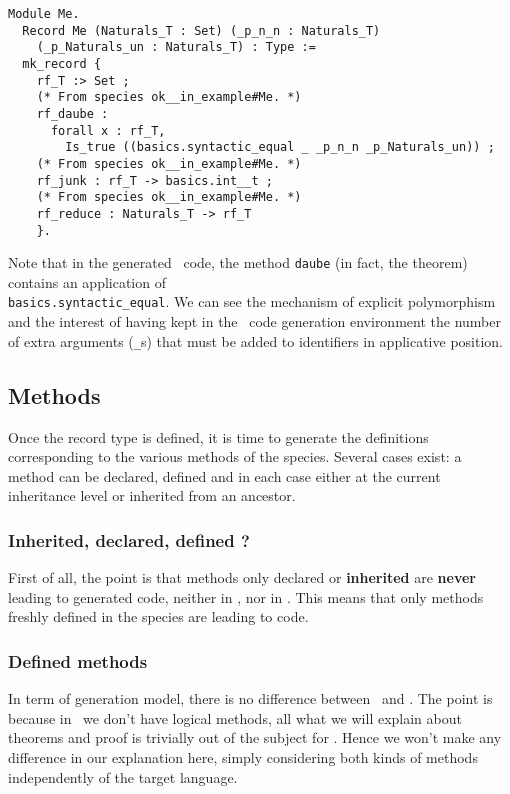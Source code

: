 {\footnotesize
\begin{lstlisting}[language=MyCoq]
Module Me.
  Record Me (Naturals_T : Set) (_p_n_n : Naturals_T)
    (_p_Naturals_un : Naturals_T) : Type :=
  mk_record {
    rf_T :> Set ;
    (* From species ok__in_example#Me. *)
    rf_daube :
      forall x : rf_T,
        Is_true ((basics.syntactic_equal _ _p_n_n _p_Naturals_un)) ;
    (* From species ok__in_example#Me. *)
    rf_junk : rf_T -> basics.int__t ;
    (* From species ok__in_example#Me. *)
    rf_reduce : Naturals_T -> rf_T
    }.
\end{lstlisting}}

\label{coq-explicit-polymorphism}
Note that in the generated \coq\ code, the method {\tt daube} (in
fact, the theorem) contains an application of \\
{\tt basics.syntactic\_equal}. We can see the mechanism of explicit
polymorphism and the interest of having kept in the \coq\ code
generation environment the number of extra arguments ({\tt \_}s) that
must be added to identifiers in applicative position.



\subsection{Methods}
\label{code-gen-model-methods}
Once the record type is defined, it is time to generate the
definitions corresponding to the various methods of the
species. Several cases exist: a method can be declared, defined and in
each case either at the current inheritance level or inherited from an
ancestor.

\subsubsection{Inherited, declared, defined ?}
First of all, the point is that methods only declared or {\bf inherited}
are {\bf never} leading to generated code, neither in \ocaml, nor in
\coq. This means that only methods freshly defined in the species are
leading to code.

\subsubsection{Defined methods}
In term of generation model, there is no difference between \ocaml\
and \coq. The point is because in \ocaml\ we don't have logical
methods, all what we will explain about theorems and proof is
trivially out of the subject for \ocaml. Hence we won't make any
difference in our explanation here, simply considering both kinds of
methods independently of the target language.

